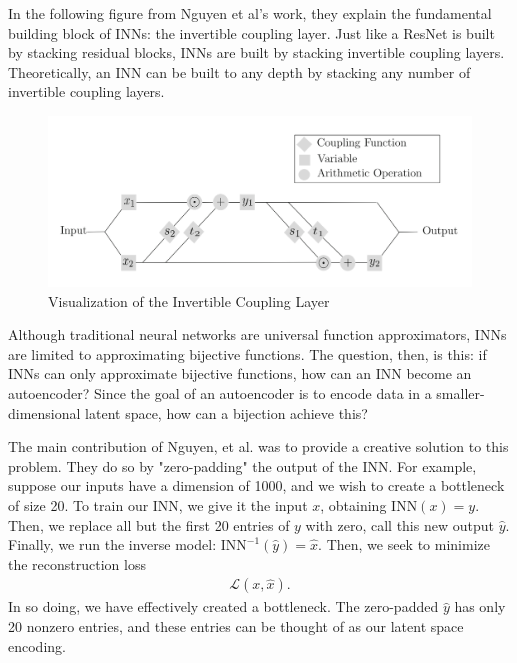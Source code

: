 \documentclass[11pt,letterpaper]{article}
\begin{document}
In the following figure from Nguyen et al's work, they explain the fundamental building block of INNs: the invertible coupling layer.
Just like a ResNet is built by stacking residual blocks, INNs are built by stacking invertible coupling layers.
Theoretically, an INN can be built to any depth by stacking any number of invertible coupling layers.

\begin{figure}[!htb]
\begin{center}
   \includegraphics[width=0.8\linewidth]{./pics/invertible_coupling_layer.png}
   \caption{Visualization of the Invertible Coupling Layer}
\end{center}
\end{figure}

Although traditional neural networks are universal function approximators, INNs are limited to approximating bijective functions.
The question, then, is this: if INNs can only approximate bijective functions, how can an INN become an autoencoder?
Since the goal of an autoencoder is to encode data in a smaller-dimensional latent space, how can a bijection achieve this?

The main contribution of Nguyen, et al. was to provide a creative solution to this problem.
They do so by "zero-padding" the output of the INN.
For example, suppose our inputs have a dimension of 1000, and we wish to create a bottleneck of size 20.
To train our INN, we give it the input $ x $, obtaining $ \text{INN}(x) = y $.
Then, we replace all but the first 20 entries of $ y $ with zero, call this new output $ \hat{y} $.
Finally, we run the inverse model: $\text{INN}^{-1}(\hat{y}) = \hat{x}$.
Then, we seek to minimize the reconstruction loss \begin{align*}
    \mathscr{L}(x, \hat{x}).
\end{align*}
In so doing, we have effectively created a bottleneck.
The zero-padded $ \hat{y} $ has only 20 nonzero entries, and these entries can be thought of as our latent space encoding.
\end{document}
